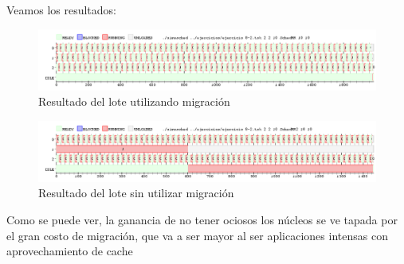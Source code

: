 \documentclass{article}
\begin{document}
Veamos los resultados:

\begin{figure}[h!]
\caption{Resultado del lote utilizando migración \label{grf:ex8-1bm}}
\centering
\includegraphics[width=15cm]{../ejercicios/ejercicio 8-2m}
\end{figure}

\begin{figure}[h!]
\caption{Resultado del lote sin utilizar migración \label{grf:ex8-1b}}
\centering
\includegraphics[width=15cm]{../ejercicios/ejercicio 8-2}
\end{figure}

Como se puede ver, la ganancia de no tener ociosos los núcleos se ve tapada por el gran costo de migración, que va a ser mayor al ser aplicaciones intensas con aprovechamiento de cache
\end{document}
